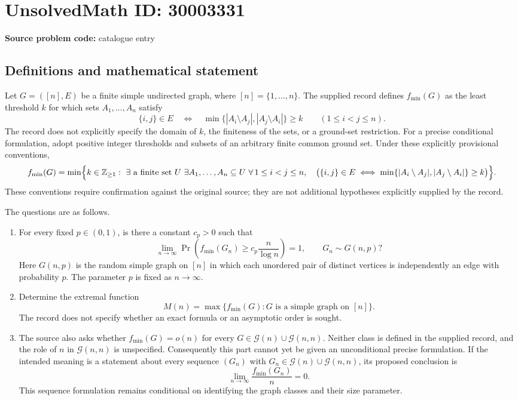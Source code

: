 \documentclass[11pt]{article}
\newcommand{\Z}{\mathbb{Z}}
\begin{document}
\section*{UnsolvedMath ID: 30003331}
\textbf{Source problem code:} catalogue entry
\subsection{Definitions and mathematical statement}
Let \(G=([n],E)\) be a finite simple undirected graph, where \([n]=\{1,\ldots,n\}\). The supplied record defines \(f_{\min}(G)\) as the least threshold \(k\) for which sets \(A_1,\ldots,A_n\) satisfy
\[
\{i,j\}\in E
\quad\Longleftrightarrow\quad
\min\bigl\{|A_i\setminus A_j|,|A_j\setminus A_i|\bigr\}\ge k
\qquad(1\le i<j\le n).
\]
The record does not explicitly specify the domain of \(k\), the finiteness of the sets, or a ground-set restriction. For a precise conditional formulation, adopt positive integer thresholds and subsets of an arbitrary finite common ground set. Under these explicitly provisional conventions,
\[
f_{\min}(G)=\min\Bigl\{k\in\Z_{\ge1}:\ \exists\text{ a finite set }U\ \exists A_1,\ldots,A_n\subseteq U\ \forall\,1\le i<j\le n,\quad
\bigl(\{i,j\}\in E\iff\min\{|A_i\setminus A_j|,|A_j\setminus A_i|\}\ge k\bigr)\Bigr\}.
\]
These conventions require confirmation against the original source; they are not additional hypotheses explicitly supplied by the record.

The questions are as follows.
\begin{enumerate}
\item For every fixed \(p\in(0,1)\), is there a constant \(c_p>0\) such that
\[
\lim_{n\to\infty}\Pr\!\left(f_{\min}(G_n)\ge c_p\frac{n}{\log n}\right)=1,
\qquad G_n\sim G(n,p)?
\]
Here \(G(n,p)\) is the random simple graph on \([n]\) in which each unordered pair of distinct vertices is independently an edge with probability \(p\). The parameter \(p\) is fixed as \(n\to\infty\).
\item Determine the extremal function
\[
M(n)=\max\{f_{\min}(G):G\text{ is a simple graph on }[n]\}.
\]
The record does not specify whether an exact formula or an asymptotic order is sought.
\item The source also asks whether \(f_{\min}(G)=o(n)\) for every \(G\in\mathcal G(n)\cup\mathcal G(n,n)\). Neither class is defined in the supplied record, and the role of \(n\) in \(\mathcal G(n,n)\) is unspecified. Consequently this part cannot yet be given an unconditional precise formulation. If the intended meaning is a statement about every sequence \((G_n)\) with \(G_n\in\mathcal G(n)\cup\mathcal G(n,n)\), its proposed conclusion is
\[
\lim_{n\to\infty}\frac{f_{\min}(G_n)}{n}=0.
\]
This sequence formulation remains conditional on identifying the graph classes and their size parameter.
\end{enumerate}
\end{document}
